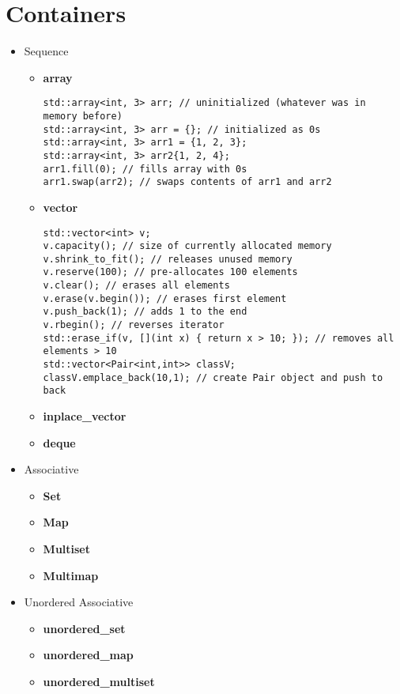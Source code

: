 \documentclass{article}
\begin{document}
\section{Containers}
\begin{itemize}
	\item Sequence
	      \begin{itemize}
		      \item \textbf{array}
		            \begin{lstlisting}[style=cpp]
std::array<int, 3> arr; // uninitialized (whatever was in memory before)
std::array<int, 3> arr = {}; // initialized as 0s
std::array<int, 3> arr1 = {1, 2, 3};
std::array<int, 3> arr2{1, 2, 4};
arr1.fill(0); // fills array with 0s
arr1.swap(arr2); // swaps contents of arr1 and arr2
      \end{lstlisting}
		      \item \textbf{vector}
		            \begin{lstlisting}[style=cpp]
std::vector<int> v;
v.capacity(); // size of currently allocated memory
v.shrink_to_fit(); // releases unused memory
v.reserve(100); // pre-allocates 100 elements
v.clear(); // erases all elements
v.erase(v.begin()); // erases first element
v.push_back(1); // adds 1 to the end
v.rbegin(); // reverses iterator
std::erase_if(v, [](int x) { return x > 10; }); // removes all elements > 10
std::vector<Pair<int,int>> classV;
classV.emplace_back(10,1); // create Pair object and push to back
         \end{lstlisting}
		      \item \textbf{inplace\_vector}
		      \item \textbf{deque}
	      \end{itemize}
	\item Associative
	      \begin{itemize}
		      \item \textbf{Set}
		      \item \textbf{Map}
		      \item \textbf{Multiset}
		      \item \textbf{Multimap}
	      \end{itemize}
	\item Unordered Associative
	      \begin{itemize}
		      \item \textbf{unordered\_set}
		      \item \textbf{unordered\_map}
		      \item \textbf{unordered\_multiset}

\end{itemize}
\end{itemize}
\end{document}
